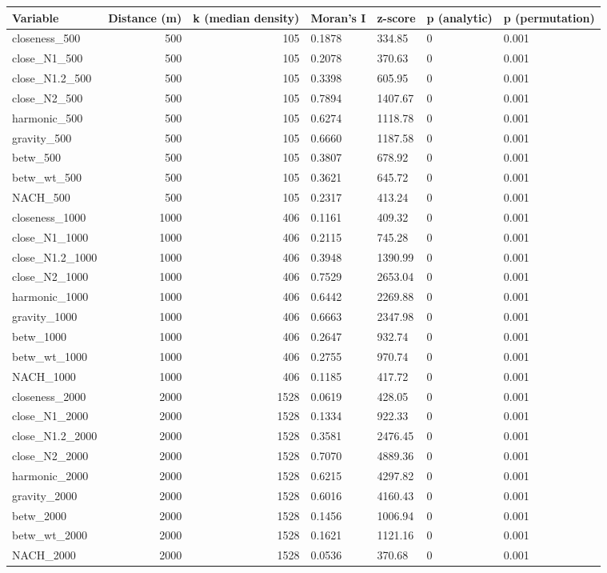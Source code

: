 \begin{tabular}{lrrllll}
\toprule
Variable & Distance (m) & k (median density) & Moran's I & z-score & p (analytic) & p (permutation) \\
\midrule
closeness\_500 & 500 & 105 & 0.1878 & 334.85 & 0 & 0.001 \\
close\_N1\_500 & 500 & 105 & 0.2078 & 370.63 & 0 & 0.001 \\
close\_N1.2\_500 & 500 & 105 & 0.3398 & 605.95 & 0 & 0.001 \\
close\_N2\_500 & 500 & 105 & 0.7894 & 1407.67 & 0 & 0.001 \\
harmonic\_500 & 500 & 105 & 0.6274 & 1118.78 & 0 & 0.001 \\
gravity\_500 & 500 & 105 & 0.6660 & 1187.58 & 0 & 0.001 \\
betw\_500 & 500 & 105 & 0.3807 & 678.92 & 0 & 0.001 \\
betw\_wt\_500 & 500 & 105 & 0.3621 & 645.72 & 0 & 0.001 \\
NACH\_500 & 500 & 105 & 0.2317 & 413.24 & 0 & 0.001 \\
closeness\_1000 & 1000 & 406 & 0.1161 & 409.32 & 0 & 0.001 \\
close\_N1\_1000 & 1000 & 406 & 0.2115 & 745.28 & 0 & 0.001 \\
close\_N1.2\_1000 & 1000 & 406 & 0.3948 & 1390.99 & 0 & 0.001 \\
close\_N2\_1000 & 1000 & 406 & 0.7529 & 2653.04 & 0 & 0.001 \\
harmonic\_1000 & 1000 & 406 & 0.6442 & 2269.88 & 0 & 0.001 \\
gravity\_1000 & 1000 & 406 & 0.6663 & 2347.98 & 0 & 0.001 \\
betw\_1000 & 1000 & 406 & 0.2647 & 932.74 & 0 & 0.001 \\
betw\_wt\_1000 & 1000 & 406 & 0.2755 & 970.74 & 0 & 0.001 \\
NACH\_1000 & 1000 & 406 & 0.1185 & 417.72 & 0 & 0.001 \\
closeness\_2000 & 2000 & 1528 & 0.0619 & 428.05 & 0 & 0.001 \\
close\_N1\_2000 & 2000 & 1528 & 0.1334 & 922.33 & 0 & 0.001 \\
close\_N1.2\_2000 & 2000 & 1528 & 0.3581 & 2476.45 & 0 & 0.001 \\
close\_N2\_2000 & 2000 & 1528 & 0.7070 & 4889.36 & 0 & 0.001 \\
harmonic\_2000 & 2000 & 1528 & 0.6215 & 4297.82 & 0 & 0.001 \\
gravity\_2000 & 2000 & 1528 & 0.6016 & 4160.43 & 0 & 0.001 \\
betw\_2000 & 2000 & 1528 & 0.1456 & 1006.94 & 0 & 0.001 \\
betw\_wt\_2000 & 2000 & 1528 & 0.1621 & 1121.16 & 0 & 0.001 \\
NACH\_2000 & 2000 & 1528 & 0.0536 & 370.68 & 0 & 0.001 \\
\bottomrule
\end{tabular}
